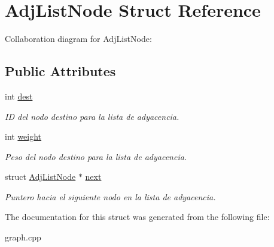 \hypertarget{structAdjListNode}{}\section{Adj\+List\+Node Struct Reference}
\label{structAdjListNode}


Collaboration diagram for Adj\+List\+Node\+:
\subsection*{Public Attributes}
\begin{DoxyCompactItemize}
\item 
\mbox{\label{structAdjListNode_a5e3a8cdea9900b927f140f21685d35c0}} 
int \hyperlink{structAdjListNode_a5e3a8cdea9900b927f140f21685d35c0}{dest}
\begin{DoxyCompactList}\small\item\em ID del nodo destino para la lista de adyacencia. \end{DoxyCompactList}\item 
\mbox{\label{structAdjListNode_ac1c361e92cf8d6da8bae9a0802169643}} 
int \hyperlink{structAdjListNode_ac1c361e92cf8d6da8bae9a0802169643}{weight}
\begin{DoxyCompactList}\small\item\em Peso del nodo destino para la lista de adyacencia. \end{DoxyCompactList}\item 
\mbox{\label{structAdjListNode_ad07931f1bcb5ab15b9baf380a118242c}} 
struct \hyperlink{structAdjListNode}{Adj\+List\+Node} $\ast$ \hyperlink{structAdjListNode_ad07931f1bcb5ab15b9baf380a118242c}{next}
\begin{DoxyCompactList}\small\item\em Puntero hacia el siguiente nodo en la lista de adyacencia. \end{DoxyCompactList}\end{DoxyCompactItemize}


The documentation for this struct was generated from the following file\+:\begin{DoxyCompactItemize}
\item 
graph.\+cpp\end{DoxyCompactItemize}
